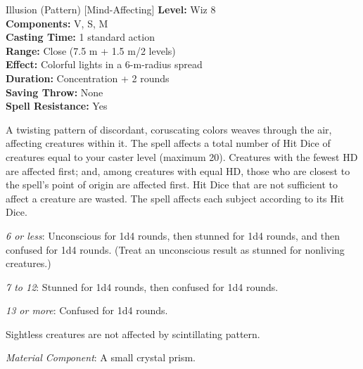 {Illusion (Pattern) [Mind-Affecting]}
{
	\textbf{Level:}
	Wiz 8\\
	\textbf{Components:}
	V, S, M\\
	\textbf{Casting Time:}
	1 standard action\\
	\textbf{Range:}
	Close (7.5 m + 1.5 m/2 levels)\\
	\textbf{Effect:}
	Colorful lights in a 6-m-radius spread\\
	\textbf{Duration:}
	Concentration + 2 rounds\\
	\textbf{Saving Throw:}
	None\\
	\textbf{Spell Resistance:}
	Yes\\
}
{
	A twisting pattern of discordant, coruscating colors weaves through the air, affecting creatures within it. The spell affects a total number of Hit Dice of creatures equal to your caster level (maximum 20). Creatures with the fewest HD are affected first; and, among creatures with equal HD, those who are closest to the spell's point of origin are affected first. Hit Dice that are not sufficient to affect a creature are wasted. The spell affects each subject according to its Hit Dice.

	\textit{6 or less}:
Unconscious for 1d4 rounds, then stunned for 1d4 rounds, and then confused for 1d4 rounds. (Treat an unconscious result as stunned for nonliving creatures.)

	\textit{7 to 12}:
	Stunned for 1d4 rounds, then confused for 1d4 rounds.

	\textit{13 or more}:
	Confused for 1d4 rounds.

	Sightless creatures are not affected by scintillating pattern.

	\textit{Material Component}:
	A small crystal prism.

}
